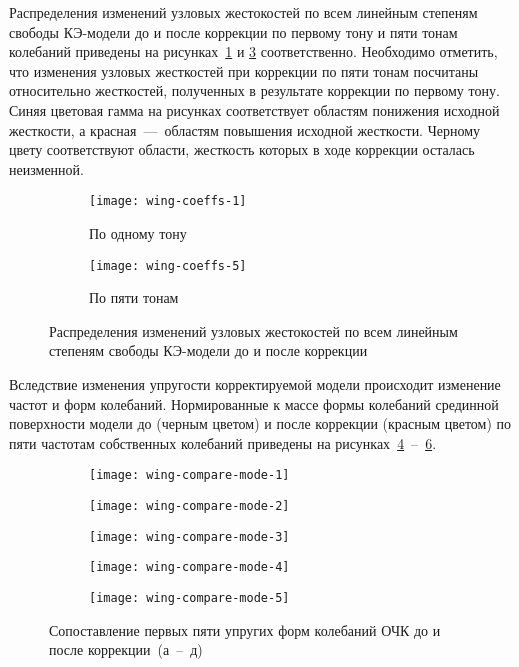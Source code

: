 Распределения изменений узловых жестокостей по всем линейным степеням свободы КЭ-модели до и после коррекции по первому тону и пяти тонам колебаний приведены на рисунках~\ref{subfig:wing-coeffs-1} и \ref{subfig:wing-coeffs-5} соответственно. Необходимо отметить, что изменения узловых жесткостей при коррекции по пяти тонам посчитаны относительно жесткостей, полученных в результате коррекции по первому тону. Синяя цветовая гамма на рисунках соответствует областям понижения исходной жесткости, а красная~---~областям повышения исходной жесткости. Черному цвету соответствуют области, жесткость которых в ходе коррекции осталась неизменной. 

\begin{figure}[!htb]
	\centering
	\begin{subfigure}[t]{\sfWing}
		\centering
		\texttt{[image: wing-coeffs-1]}
		\caption{По одному тону} \label{subfig:wing-coeffs-1} 
	\end{subfigure}
	\hfill
	\begin{subfigure}[t]{\sfWing}
		\centering
		\texttt{[image: wing-coeffs-5]}
		\caption{По пяти тонам} \label{subfig:wing-coeffs-5}
	\end{subfigure}	
	\caption{Распределения изменений узловых жестокостей по всем линейным степеням свободы КЭ-модели до и после коррекции}
\end{figure}

Вследствие изменения упругости корректируемой модели происходит изменение частот и форм колебаний. Нормированные к массе формы колебаний срединной поверхности модели до (черным цветом) и после коррекции (красным цветом) по пяти частотам собственных колебаний приведены на рисунках~\ref{subfig:wing-compare-mode-1}~--~\ref{subfig:wing-compare-mode-5}.

\begin{figure}[!htb]
	\centering
	\begin{subfigure}[t]{\sfWing}
		\centering
		\texttt{[image: wing-compare-mode-1]}
		\caption{} \label{subfig:wing-compare-mode-1} 
	\end{subfigure}
	\hfill
	\begin{subfigure}[t]{\sfWing}
		\centering
		\texttt{[image: wing-compare-mode-2]}
		\caption{} 
	\end{subfigure}	
	\begin{subfigure}[t]{\sfWing}
		\centering
		\texttt{[image: wing-compare-mode-3]}
		\caption{} 
	\end{subfigure}	
	\hfill
	\begin{subfigure}[t]{\sfWing}
		\centering
		\texttt{[image: wing-compare-mode-4]}
		\caption{} 
	\end{subfigure}	
	\begin{subfigure}[t]{\sfWing}
		\centering
		\texttt{[image: wing-compare-mode-5]}
		\caption{} \label{subfig:wing-compare-mode-5} 
	\end{subfigure}	
	\caption{Сопоставление первых пяти упругих форм колебаний ОЧК до и после коррекции~(а~--~д)}
\end{figure}

